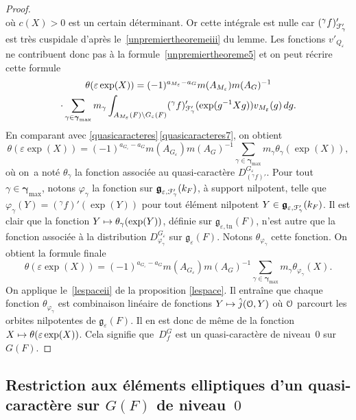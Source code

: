 \documentclass[11pt]{article}
\newcommand{\Subsection}{\subsection}
\numberwithin{equation}{section}\providecommand{\og}{«\,}\providecommand{\fg}{\,»}
\let\mathcal \EuScript
\let\epsilon\varepsilon
\newcommand\mto{\mathchoice{\longmapsto}{\mapsto}{\mapsto}{\mapsto}}
\newcommand{\frg}{\mathfrak{g}}
\newcommand{\tn}{\mathrm{tn}}
\newcommand{\cF}{\mathcal{F}}
\newcommand{\cO}{\mathcal{O}}
\theoremstyle{plain}
\theoremstyle{definition}
\begin{document}
\begin{proof}
\[\]
où $c(X)>0$ est un certain déterminant. Or cette intégrale est nulle car $(^{\gamma}f)'_{\cF'_{\gamma}}$ est très cuspidale d'après le~\eqref{unpremiertheoremeiii} du lemme. Les fonctions $v'_{Q_{\epsilon}}$ ne contribuent donc pas à la formule~\eqref{unpremiertheoreme5} et on peut récrire cette formule
\begin{multline*}
\theta(\epsilon \exp(X))=(-1)^{a_{M_{\epsilon}}-a_{G}}m(A_{M_{\epsilon}})m(A_{G})^{-1}\\
\cdot\sum_{\gamma\in \boldsymbol{\gamma}_{\max}}m_{\gamma}
\int_{A_{M_{\epsilon}}(F)\backslash G_{\epsilon}(F)}(^{\gamma}f)'_{\cF'_{\gamma}}(\exp(g^{-1}X g))v_{M_{\epsilon}} (g)\,dg.
\end{multline*}
En comparant avec \ref{quasicaracteres}\,\eqref{quasicaracteres7}, on obtient
\[
\theta(\epsilon \exp(X))=(-1)^{a_{G_{\epsilon}}-a_{G}}m(A_{G_{\epsilon}})m(A_{G})^{-1}\sum_{\gamma\in \boldsymbol{\gamma}_{\max}}m_{\gamma}\theta_{\gamma}(\exp(X)),
\]
où on~a noté $\theta_{\gamma}$ la fonction associée au quasi-caractère $D^{G_{\epsilon}}_{(^{\gamma}f)'}$. Pour tout $\gamma\in \boldsymbol{\gamma}_{\max}$, notons $\varphi_{\gamma}$ la fonction sur $\boldsymbol{\frg}_{\epsilon,\cF'_{\gamma}}(k_{F})$, à support nilpotent, telle que $\varphi_{\gamma}(Y)=(^{\gamma}f)'(\exp(Y))$ pour tout élément nilpotent $Y\in \boldsymbol{\frg}_{\epsilon,\cF'_{\gamma}}(k_{F})$. Il est clair que la fonction $Y\mto \theta_{\gamma}(\exp(Y))$, définie sur $\frg_{\epsilon,\tn}(F)$, n'est autre que la fonction associée à la distribution $D^{G_{\epsilon}}_{\varphi_{\gamma}}$ sur $\frg_{\epsilon}(F)$. Notons $\theta_{\varphi_{\gamma}}$ cette fonction. On obtient la formule finale
\begin{equation}\tag{6}\label{unpremiertheoreme6}
\theta(\epsilon \exp(X))=(-1)^{a_{G_{\epsilon}}-a_{G}}m(A_{G_{\epsilon}})m(A_{G})^{-1}\sum_{\gamma\in \boldsymbol{\gamma}_{\max}}m_{\gamma}\theta_{\varphi_{\gamma}}(X).
\end{equation}
On applique le~\eqref{lespaceii} de la proposition \ref{lespace}. Il entraîne que chaque fonction $\theta_{\varphi_{\gamma}}$ est combinaison linéaire de fonctions $Y\mto \hat{j}(\cO,Y)$ où $\cO$ parcourt les orbites nilpotentes de $\frg_{\epsilon}(F)$. Il en est donc de même
de la fonction $X\mto \theta(\epsilon \exp(X))$. Cela signifie que~$D^G_{f}$ est un quasi-caractère de niveau~$0$ sur $G(F)$.
\end{proof}

\Subsection{Restriction aux éléments elliptiques d'un quasi-caractère sur \texorpdfstring{$G(F)$ de niveau~$0$}{GF0}}\label{restriction}
\end{document}
